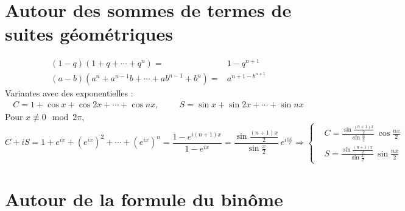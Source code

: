 \section{Autour des sommes de termes de suites géométriques}
\begin{align*}
 (1-q)(1+q+\cdots+q^n)=&1-q^{n+1} \\
(a-b)(a^n+a^{n-1}b+\cdots+ab^{n-1}+b^n) =& a^{n+1 - b^{n+1}}
\end{align*}
Variantes avec des exponentielles :
\begin{align*}
C = 1+\cos x + \cos 2x + \cdots + \cos nx, \hspace{1cm}
S = \sin x + \sin 2x + \cdots + \sin nx
\end{align*}
Pour $x\not \equiv 0 \mod 2\pi$,
\begin{displaymath}
  C+iS = 1 + e^{ix} +(e^{ix})^2 + \cdots + (e^{ix})^n
  = \frac{1-e^{i(n+1)x}}{1-e^{ix}} = \frac{\sin\frac{(n+1)x}{2}}{\sin\frac{x}{2}}\,e^{i\frac{nx}{2}}
\Rightarrow
\left\lbrace 
\begin{aligned}
  &C = \frac{\sin\frac{(n+1)x}{2}}{\sin\frac{x}{2}}\, \cos\frac{nx}{2}\\
  &S = \frac{\sin\frac{(n+1)x}{2}}{\sin\frac{x}{2}}\, \sin\frac{nx}{2}
\end{aligned}
\right. 
\end{displaymath}

\section{Autour de la formule du binôme}
